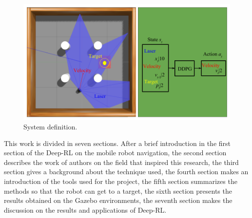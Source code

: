\begin{figure}[H]
\centerline{\includegraphics[width=12cm]{images/mapless_en.png}}
\caption{System definition.}
\label{fig:mapless}
\end{figure}

This work is divided in seven sections.
After a brief introduction in the first section of the Deep-RL on the mobile robot navigation, the second section describes the work of authors on the field that inspired this research, the third section gives a background about the technique used, the fourth section makes an introduction of the tools used for the project, the fifth section summarizes the methods so that the robot can get to a target, the sixth section presents the results obtained on the Gazebo environments, the seventh section makes the discussion on the results and applications of Deep-RL.